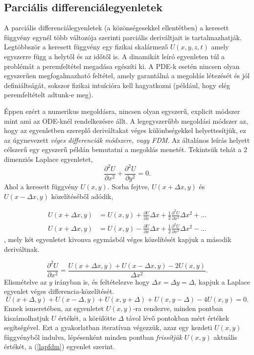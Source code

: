 \documentclass[12pt]{article}
\theoremstyle{plain}
\begin{document}
\subsection{Parciális differenciálegyenletek}
A parciális differenciálegyenletek (a közönségesekkel ellentétben) a keresett függvény egynél több változója szerinti parciális deriváltjait is tartalmazhatják. Legtöbbször a keresett függvény egy fizikai skalármező $U(x, y, z, t)$ amely egyszerre függ a helytől és az időtől is. A dinamikát leíró egyenleten túl a problémát a peremfeltétel megadása egészíti ki. A PDE-k esetén nincsen olyan egyszerűen megfogalmazható feltétel, amely garantálná a megoldás létezését és jól definiáltságát, sokszor fizikai intuícióra kell hagyatkozni (például, hogy elég peremfeltételt adtunk-e meg). 

Éppen ezért a numerikus megoldásra, nincsen olyan egyszerű, explicit módszer mint ami az ODE-knél rendelkezésre állt. A legegyszerűbb megoldási módszer az, hogy az egyenletben szereplő deriváltakat véges különbségekkel helyettesítjük, ez az úgynevezett {\em véges differenciák módszere, vagy FDM}. Az általános leírás helyett célszerű egy egyszerű példán bemutatni a megoldás menetét. Tekintsük tehát a 2 dimenziós Laplace egyenletet, 
\begin{equation}
    \label{2dlap}
    \frac{\partial ^2 U}{\partial x^2}  + \frac{\partial ^2 U}{\partial y^2} = 0.
\end{equation}
Ahol a keresett függvény $U(x,y)$. Sorba fejtve, $U(x+\Delta x, y)$ és $U(x - \Delta x, y)$ közelítéséből adódik,

\begin{align}
  U(x + \Delta x, y) &= U(x, y) + \frac{\partial U}{\partial x}\Delta x + \frac{1}{2}\frac{\partial ^2 U}{\partial x^2}\Delta x^2 + ... \\
    U(x + \Delta x, y) &= U(x, y) - \frac{\partial U}{\partial x}\Delta x + \frac{1}{2}\frac{\partial ^2 U}{\partial x^2}\Delta x^2 - ...
    \end{align},
mely két egyenletet kivonva egymásból véges közelítését kapjuk a második deriváltnak.

\begin{equation}
\label{fdm}
\frac{\partial ^2 U}{\partial x^2} = \frac{U(x + \Delta x, y) + U(x- \Delta x, y) - 2U(x,y)}{\Delta x ^2}.
\end{equation}
Elismételve az $y$ irányban is, és feltételezve hogy $\Delta x = \Delta y = \Delta$, kapjuk a Laplace egyenlet véges differencia-közelítését.
\begin{equation}
    \label{lapfdm}
    U(x + \Delta, y) + U(x - \Delta, y) + U(x, y+ \Delta) + U(x, y - \Delta) - 4 U(x, y) = 0. 
\end{equation}
Ennek ismeretében, az egyenletet $U(x,y)$-ra rendezve, minden pontban kiszámolhatjuk $U$ értékét, a körülötte $\Delta$ távol lévő pontokban mért értékek segítségével. Ezt a gyakorlatban iteratívan végezzük, azaz egy  kezdeti $U(x,y)$ függvényből indulva, lépésenként minden pontban {\em frissítjük} $U(x,y)$ aktuális értékét, a (\ref{lapfdm}) egyenlet szerint. 
\end{document}

